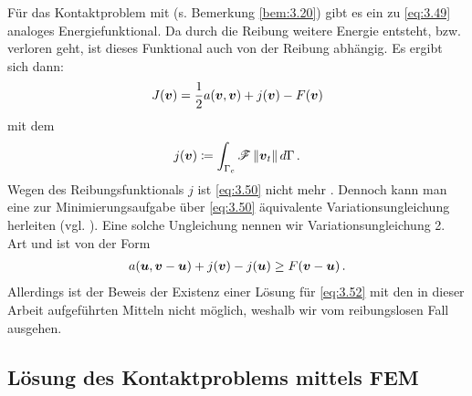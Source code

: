 \begin{bem}\label{bem:3.24}
Für das Kontaktproblem mit  (s. Bemerkung \ref{bem:3.20}) gibt es ein zu \eqref{eq:3.49} analoges Energiefunktional. Da durch die Reibung weitere Energie entsteht, bzw. verloren geht, ist dieses Funktional auch von der Reibung abhängig. Es ergibt sich dann:
\begin{align}\label{eq:3.50}
	J(\boldsymbol v) = \frac 12 a(\boldsymbol v,\boldsymbol v) + j(\boldsymbol v)-F(\boldsymbol v)
\end{align}
mit dem \textit{}
\begin{align}\label{eq:3.51}
	j(\boldsymbol v) \coloneqq \int_{\Gamma_c} \mathscr F\,  \lVert \boldsymbol v_t\rVert \, d\Gamma \, .
\end{align}
Wegen des Reibungsfunktionals $j$ ist \eqref{eq:3.50} nicht mehr . Dennoch kann man eine zur Minimierungsaufgabe über \eqref{eq:3.50} äquivalente Variationsungleichung herleiten (vgl. \cite{EPSContact}). Eine solche Ungleichung nennen wir Variationsungleichung 2. Art und ist von der Form
\begin{align}\label{eq:3.52}
	a(\boldsymbol u, \boldsymbol v-\boldsymbol u) + j(\boldsymbol v) -  j(\boldsymbol u) \ge F(\boldsymbol v-\boldsymbol u) \, .
\end{align}
Allerdings ist der Beweis der Existenz einer Lösung für \eqref{eq:3.52} mit den in dieser Arbeit aufgeführten Mitteln nicht möglich, weshalb wir vom reibungslosen Fall ausgehen.
\end{bem}






\subsection{Lösung des Kontaktproblems mittels FEM}
\label{kap:3.2.3}

